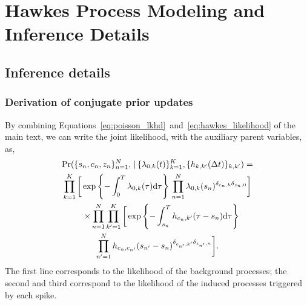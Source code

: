 \chapter{Hawkes Process Modeling and Inference Details}
\label{AppendixB}

\section{Inference details}
\subsection{Derivation of conjugate prior updates}
By combining
Equations~\ref{eq:poisson_lkhd}~and~\ref{eq:hawkes_likelihood} of the
main text, we can write the joint likelihood, with the auxiliary
parent variables, as,
\begin{multline}
  \label{eq:complete_likelihood}
  \Pr(\{s_n,c_n,z_n\}^N_{n=1},\,|\, \{\lambda_{0,k}(t)\}^K_{k=1}, \{h_{k,k'}(\Delta t)\}_{k,k'}) = \\
  \prod^K_{k=1} \bigg[
  \exp\left\{ -\int_0^T \lambda_{0,k}(\tau)\mathrm{d}\tau \right\} \,
  \prod^N_{n=1}
   \lambda_{0,k}(s_n)^{\delta_{c_n,k}\delta_{z_n,0}} \bigg]\\
  \quad\times \prod_{n=1}^N\prod_{k'=1}^K \bigg[
  \exp\left\{-\int^T_{s_n} h_{c_n,k'}(\tau - s_n)\mathrm{d}\tau \right\}\\
  \prod^N_{n'=1} h_{c_n,c_{n'}}(s_{n'}-s_n)^{\delta_{c_{n'},k'}\delta_{z_{n'},n}}\bigg].
\end{multline}
The first line corresponds to the likelihood of the background
processes; the second and third correspond to the likelihood of the
induced processes triggered by each spike.

